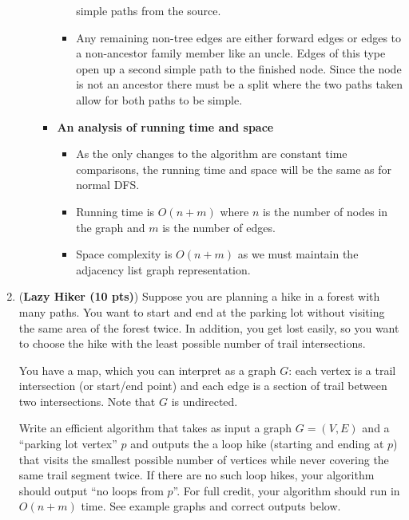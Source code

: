 \documentclass[letterpaper,11pt]{article}
\begin{document}
\begin{enumerate}
\begin{enumerate}
\begin{itemize}
\begin{itemize}
                    simple paths from the source.
                \item Any remaining non-tree edges are either forward edges or
                    edges to a non-ancestor family member like an uncle. Edges 
                    of this type open up a second simple path to the finished 
                    node. Since the node is not an ancestor there must be a split
                    where the two paths taken allow for both paths to be simple.
            \end{itemize}
    \item \textbf{An analysis of running time and space}
        \begin{itemize}
            \item  As the only changes to the algorithm are constant time 
                comparisons, the running time and space will be the same as for
                normal DFS.
            \item Running time is $O\left( n + m \right) $ where $n$ is the 
                number of nodes in the graph and $m$ is the number of edges.
            \item Space complexity is $O\left( n + m \right) $ as we must 
                maintain the adjacency list graph representation.
        \end{itemize}

    \end{itemize}

\end{enumerate}




\newpage 
\item({\bf Lazy Hiker (10 pts)}) Suppose you are planning a hike in a forest with many paths. You want to start and end at the parking lot without visiting the same area of the forest twice. In addition, you get lost easily, so you want to choose the hike with the least possible number of trail intersections. 

You have a map, which you can interpret as a graph $G$: each vertex is a trail intersection (or start/end point) and each edge is a section of trail between two intersections. Note that $G$ is undirected.

Write an efficient algorithm that takes as input a graph $G = (V,E)$ and a ``parking lot vertex'' $p$ and outputs the a loop hike (starting and ending at $p$) that visits the smallest possible number of vertices while never covering the same trail segment twice. If there are no such loop hikes, your algorithm should output ``no loops from $p$''. For full credit, your algorithm should run in $O(n+m)$ time. See example graphs and correct outputs below.


\end{enumerate}
\end{document}
